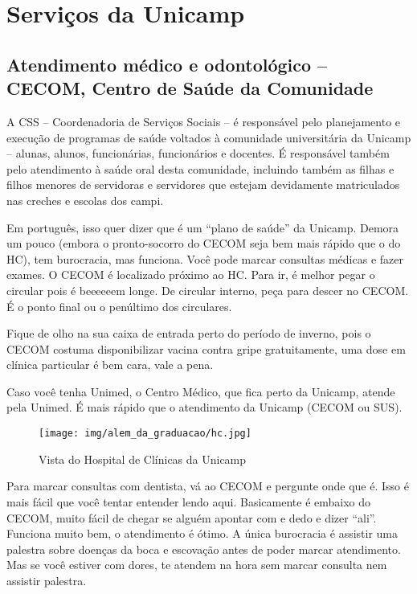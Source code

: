 
\section{Serviços da Unicamp}
\subsection{Atendimento médico e odontológico -- CECOM, Centro de Saúde da
Comunidade}

A CSS -- Coordenadoria de Serviços Sociais -- é responsável pelo planejamento e
execução de programas de saúde voltados à comunidade universitária da Unicamp
-- alunas, alunos, funcionárias, funcionários e docentes. É responsável também
pelo atendimento à saúde oral desta comunidade, incluindo também as filhas e
filhos menores de servidoras e servidores que estejam devidamente matriculados
nas creches e escolas dos campi.

Em português, isso quer dizer que é um ``plano de saúde'' da Unicamp. Demora um
pouco (embora o pronto-socorro do CECOM seja bem mais rápido que o do HC), tem
burocracia, mas funciona. Você pode marcar consultas médicas e fazer exames. O
CECOM é localizado próximo ao HC. Para ir, é melhor pegar o circular pois é
beeeeeem longe. De circular interno, peça para descer no CECOM. É o ponto final
ou o penúltimo dos circulares.

Fique de olho na sua caixa de entrada perto do período de inverno, pois o CECOM
costuma disponibilizar vacina contra gripe gratuitamente, uma dose em clínica
particular é bem cara, vale a pena.

Caso você tenha Unimed, o Centro Médico, que fica perto da Unicamp, atende pela
Unimed. É mais rápido que o atendimento da Unicamp (CECOM ou SUS).

\begin{figure}[h!]
    \centering
    \texttt{[image: img/alem\_da\_graduacao/hc.jpg]}
    \caption{Vista do Hospital de Clínicas da Unicamp}
\end{figure}

Para marcar consultas com dentista, vá ao CECOM e pergunte onde que é. Isso é
mais fácil que você tentar entender lendo aqui. Basicamente é embaixo do CECOM,
muito fácil de chegar se alguém apontar com e dedo e dizer ``ali''. Funciona
muito bem, o atendimento é ótimo. A única burocracia é assistir uma palestra
sobre doenças da boca e escovação antes de poder marcar atendimento. Mas se
você estiver com dores, te atendem na hora sem marcar consulta nem assistir
palestra.

